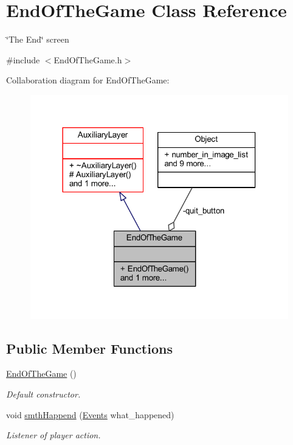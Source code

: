 \hypertarget{class_end_of_the_game}{}\section{End\+Of\+The\+Game Class Reference}
\label{class_end_of_the_game}


\char`\"{}\+The End\char`\"{} screen  




{\ttfamily \#include $<$End\+Of\+The\+Game.\+h$>$}



Collaboration diagram for End\+Of\+The\+Game\+:\nopagebreak
\begin{figure}[H]
\begin{center}
\leavevmode
\includegraphics[width=318pt]{class_end_of_the_game__coll__graph}
\end{center}
\end{figure}
\subsection*{Public Member Functions}
\begin{DoxyCompactItemize}
\item 
\mbox{\label{class_end_of_the_game_a27eaa843d569afd8565ed6369ea82e4f}} 
\hyperlink{class_end_of_the_game_a27eaa843d569afd8565ed6369ea82e4f}{End\+Of\+The\+Game} ()
\begin{DoxyCompactList}\small\item\em Default constructor. \end{DoxyCompactList}\item 
void \hyperlink{class_end_of_the_game_a88ac00a6aaa5193c7642d9ea2c6be688}{smth\+Happend} (\hyperlink{_events_8h_af60e00b78607064c5be6aa9397ea49c1}{Events} what\+\_\+happened)
\begin{DoxyCompactList}\small\item\em Listener of player action. \end{DoxyCompactList}\end{DoxyCompactItemize}
